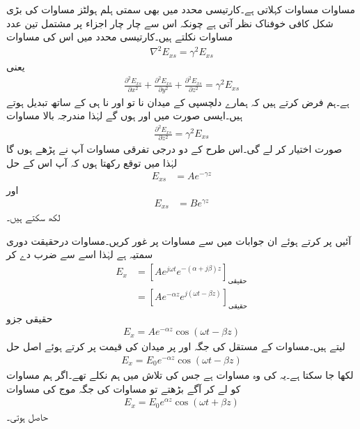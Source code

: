  مساوات    مساوات کہلاتی ہے۔کارتیسی محدد میں بھی سمتی ہلم ہولٹز مساوات کی بڑی شکل  کافی خوفناک نظر آتی ہے چونکہ اس سے چار چار اجزاء پر مشتمل تین عدد مساوات نکلتے ہیں۔کارتیسی محدد میں اس  کی  مساوات 
\begin{align}
\nabla^2 E_{xs}=\gamma^2 E_{xs} 
\end{align}
یعنی
\begin{align}
\frac{\partial^2  E_{xs}}{\partial x^2}+\frac{\partial^2  E_{xs}}{\partial y^2}+\frac{\partial^2  E_{xs}}{\partial z^2} =\gamma^2  E_{xs} 
\end{align}
ہے۔ہم فرض کرتے ہیں کہ ہمارے دلچسپی کے میدان نا تو  اور نا ہی  کے ساتھ تبدیل ہوتے ہیں۔ایسی صورت
 میں  اور  ہوں گے لہٰذا  مندرجہ بالا مساوات
\begin{align}
\frac{\partial^2  E_{xs}}{\partial z^2} =\gamma^2 E_{xs} 
\end{align}
صورت اختیار کر لے گی۔اس طرح کے دو درجی تفرقی مساوات آپ نے پڑھے ہوں گا لہٰذا میں توقع رکھتا ہوں کہ آپ اس کے حل
\begin{align}\label{مساوات_موج_مثبت_زیڈ_جانب}
E_{xs}&=A e^{-\gamma z}
\end{align}
اور
\begin{align}\label{مساوات_موج_منفی_زیڈ_جانب}
E_{xs}&=Be^{\gamma z}
\end{align}
لکھ سکتے ہیں۔

آئیں  پر کرتے ہوئے ان جوابات میں سے مساوات  پر غور کریں۔مساوات  درحقیقت دوری سمتیہ ہے لہٰذا اسے   سے ضرب دے کر
\begin{align*}
E_x&=\left[A e^{j \omega t} e^{-(\alpha+j \beta) z} \right]_{\textrm{حقیقی}}\\
&=\left[A e^{-\alpha z} e^{j(\omega t -\beta z)} \right]_{\textrm{حقیقی}}
\end{align*}
حقیقی  جزو
\begin{align*}
E_x=A e^{-\alpha z} \cos (\omega t -\beta z)
\end{align*}
لیتے ہیں۔مساوات کے مستقل  کی جگہ  اور  پر میدان کی قیمت  پر کرتے ہوئے اصل حل
\begin{align}\label{مساوات_موج_کوسائن_مثبت_موج}
E_x=E_0 e^{-\alpha z} \cos (\omega t -\beta z)
\end{align}
لکھا جا سکتا ہے۔یہ  کی وہ مساوات  ہے جس کی تلاش میں ہم نکلے تھے۔اگر ہم مساوات  کو لے کر آگے بڑھتے تو مساوات  کی جگہ موج کی مساوات
\begin{align}\label{مساوات_موج_کوسائن_منفی_موج}
E_x=E_0 e^{\alpha z} \cos (\omega t +\beta z)
\end{align}
حاصل ہوتی۔

